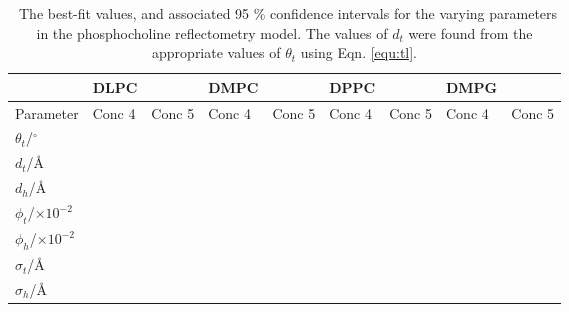\documentclass[twoside,twocolumn,9pt]{article}
\begin{document}
\begin{table}
	\small
	\caption{\ The best-fit values, and associated 95 \% confidence intervals for the varying parameters in the phosphocholine reflectometry model. The values of $d_t$ were found from the appropriate values of $\theta_t$ using Eqn. \ref{equ:tl}.}
	\label{tab:liptab}
	\begin{tabular*}{\textwidth}{@{\extracolsep{\fill}}lllllllll}
		\hline
		 & DLPC & & DMPC & & DPPC & & DMPG & \\
		\hline
		Parameter & Conc 4 & Conc 5 & Conc 4 & Conc 5 & Conc 4 & Conc 5 & Conc 4 & Conc 5 \\
		$\theta_t$/$^\circ$ &  &  &  &  &  &  &  &  \\
		$d_t$/\AA &  &  &  &  &  &  &  &  \\
		$d_h$/\AA &  &  &  &  &  &  &  &  \\
		$\phi_t$/$\times10^{-2}$ &  &  &  &  &  &  &  &  \\
		$\phi_h$/$\times10^{-2}$ &  &  &  &  &  &  &  &  \\
		$\sigma_t$/\AA &  &  &  &  &  &  &  &  \\
		$\sigma_h$/\AA &  &  &  &  &  &  &  &  \\
		\hline
	\end{tabular*}
\end{table}
\end{document}
